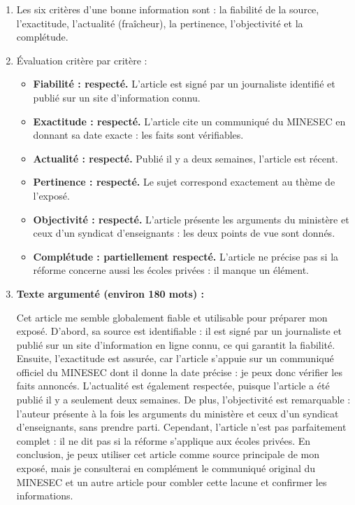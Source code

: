 \documentclass[11pt]{article}
\newcommand{\cle}[1]{{\popxbold\color{popdark}#1}}
\begin{document}
\begin{corrige}
\begin{enumerate}
\item Les six critères d'une bonne information sont : la \cle{fiabilité} de la source, l'\cle{exactitude}, l'\cle{actualité} (fraîcheur), la \cle{pertinence}, l'\cle{objectivité} et la \cle{complétude}.
\item Évaluation critère par critère :
\begin{itemize}
\item \textbf{Fiabilité : respecté.} L'article est signé par un journaliste identifié et publié sur un site d'information connu.
\item \textbf{Exactitude : respecté.} L'article cite un communiqué du MINESEC en donnant sa date exacte : les faits sont vérifiables.
\item \textbf{Actualité : respecté.} Publié il y a deux semaines, l'article est récent.
\item \textbf{Pertinence : respecté.} Le sujet correspond exactement au thème de l'exposé.
\item \textbf{Objectivité : respecté.} L'article présente les arguments du ministère et ceux d'un syndicat d'enseignants : les deux points de vue sont donnés.
\item \textbf{Complétude : partiellement respecté.} L'article ne précise pas si la réforme concerne aussi les écoles privées : il manque un élément.
\end{itemize}
\item \textbf{Texte argumenté (environ 180 mots) :}

Cet article me semble globalement fiable et utilisable pour préparer mon exposé. D'abord, sa source est identifiable : il est signé par un journaliste et publié sur un site d'information en ligne connu, ce qui garantit la \cle{fiabilité}. Ensuite, l'\cle{exactitude} est assurée, car l'article s'appuie sur un communiqué officiel du MINESEC dont il donne la date précise : je peux donc vérifier les faits annoncés. L'\cle{actualité} est également respectée, puisque l'article a été publié il y a seulement deux semaines. De plus, l'\cle{objectivité} est remarquable : l'auteur présente à la fois les arguments du ministère et ceux d'un syndicat d'enseignants, sans prendre parti. Cependant, l'article n'est pas parfaitement \cle{complet} : il ne dit pas si la réforme s'applique aux écoles privées. En conclusion, je peux utiliser cet article comme source principale de mon exposé, mais je consulterai en complément le communiqué original du MINESEC et un autre article pour combler cette lacune et confirmer les informations.


\end{enumerate}
\end{corrige}
\end{document}
